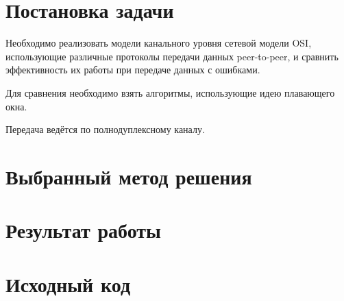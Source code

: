 \documentclass[a4paper,10pt]{article}
\begin{document}


\tableofcontents
\pagebreak


\section{Постановка задачи}
Необходимо реализовать модели канального уровня сетевой модели OSI, 
использующие различные протоколы передачи данных peer-to-peer, 
и сравнить эффективность их работы при передаче данных с ошибками.

Для сравнения необходимо взять алгоритмы, 
использующие идею плавающего окна.

Передача ведётся по полнодуплексному каналу.

\section{Выбранный метод решения}

\subsection{}

\section{Результат работы}

\pagebreak

\appendix
\section{Исходный код}
\label{appendix-sources}



\pagebreak



\end{document}
